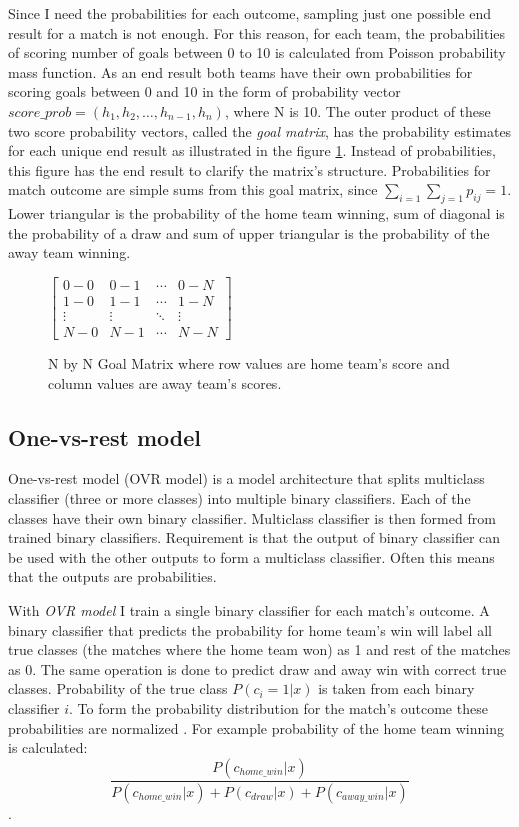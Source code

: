 Since I need the probabilities for each outcome, sampling just one possible end result for a match is not enough. For this reason, for each team, the probabilities of scoring number of goals between 0 to 10 is calculated from Poisson probability mass function. As an end result both teams have their own probabilities for scoring goals between 0 and 10 in the form of probability vector $score\_prob = \left( h _ { 1 } , h _ { 2 } , \dots , h _ { n - 1 } , h _ { n } \right)$, where N is 10. The outer product of these two score probability vectors, called the \textit{goal matrix}, has the probability estimates for each unique end result as illustrated in the figure \ref{fig:goal_matrix}. Instead of probabilities, this figure has the end result to clarify the matrix's structure. Probabilities for match outcome are simple sums from this goal matrix, since $\sum_{i=1}\sum_{j=1}p_{ij} = 1$. Lower triangular is the probability of the home team winning, sum of diagonal is the probability of a draw and sum of upper triangular is the probability of the away team winning.
\begin{figure}
    $\begin{bmatrix}
    0-0 & 0-1 & \cdots & 0-N \\
    1-0 & 1-1 & \cdots   &1-N \\
    \vdots & \vdots   & \ddots & \vdots \\
    N-0 & N-1 & \cdots & N-N\end{bmatrix}$
\caption{N by N Goal Matrix where row values are home team's score and column values are away team's scores.}
\label{fig:goal_matrix}
\end{figure}

\subsection{One-vs-rest model}
One-vs-rest model (OVR model) is a model architecture that splits multiclass classifier (three or more classes) into multiple binary classifiers. Each of the classes have their own binary classifier. Multiclass classifier is then formed from trained binary classifiers. Requirement is that the output of binary classifier can be used with the other outputs to form a multiclass classifier. Often this means that the outputs are probabilities.

With \textit{OVR model} I train a single binary classifier for each match's outcome. A binary classifier that predicts the probability for home team's win will label all true classes (the matches where the home team won) as 1 and rest of the matches as 0. The same operation is done to predict draw and away win with correct true classes. Probability of the true class $P(c_i = 1 | x)$ is taken from each binary classifier $i$. To form the probability distribution for the match's outcome these probabilities are normalized \cite{zadrozny2002transforming}. For example probability of the home team winning is calculated:
\begin{equation}
\frac{P(c_{home\_win}| x)}{P(c_{home\_win}| x) + P(c_{draw}| x) + P(c_{away\_win}| x)}
\end{equation}.

